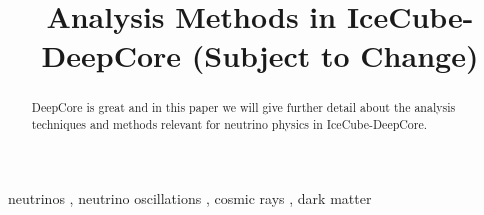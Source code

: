 \begin{frontmatter}


  \title{Analysis Methods in IceCube-DeepCore (Subject to Change)}

%


\begin{abstract}

DeepCore is great and in this paper we will give further detail about
the analysis techniques and methods relevant for neutrino physics in
IceCube-DeepCore.

\end{abstract}


\begin{keyword}


neutrinos \sep
neutrino oscillations \sep
cosmic rays \sep
dark matter

\end{keyword}

\end{frontmatter}
